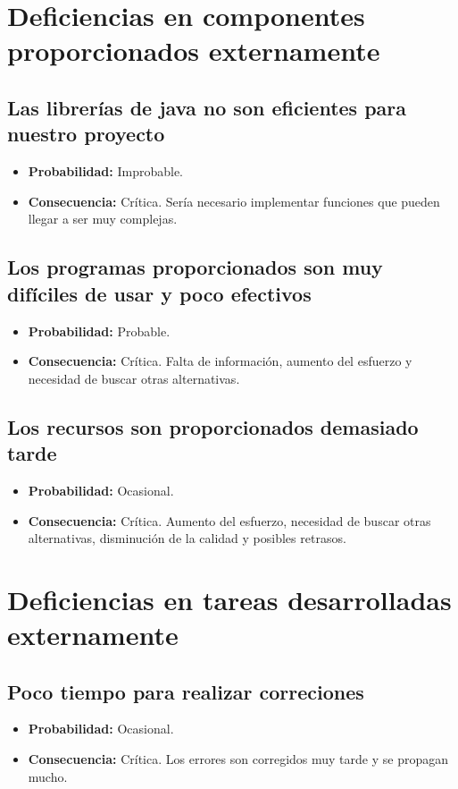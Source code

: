 \documentclass[spanish,a4paper,12pt]{report}	%
\begin{document}
%
\section{Deficiencias en componentes proporcionados externamente}

	\subsection*{Las librerías de java no son eficientes para nuestro proyecto}	
		\begin{itemize}
			\item \textbf {Probabilidad: }Improbable.
			\item \textbf {Consecuencia: }Crítica. Sería necesario implementar funciones que pueden llegar a ser muy complejas.
		\end{itemize}
	
	\subsection*{Los programas proporcionados son muy difíciles de usar y poco efectivos}	
		\begin{itemize}
			\item \textbf {Probabilidad: }Probable.
			\item \textbf {Consecuencia: }Crítica. Falta de información, aumento del esfuerzo y necesidad de buscar otras alternativas.
		\end{itemize}
	
	\subsection*{Los recursos son proporcionados demasiado tarde}	
		\begin{itemize}
			\item \textbf {Probabilidad: }Ocasional.
			\item \textbf {Consecuencia: }Crítica. Aumento del esfuerzo, necesidad de buscar otras alternativas, disminución de la calidad y posibles retrasos.
		\end{itemize}

%
\section{Deficiencias en tareas desarrolladas externamente}

	\subsection*{Poco tiempo para realizar correciones}	
		\begin{itemize}
			\item \textbf {Probabilidad: }Ocasional.
			\item \textbf {Consecuencia: }Crítica. Los errores son corregidos muy tarde y se propagan mucho.
		\end{itemize}
\end{document}
